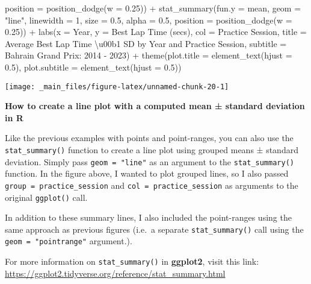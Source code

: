 \documentclass[
]{book}
\newenvironment{Shaded}{\begin{snugshade}}{\end{snugshade}}
\newcommand{\AttributeTok}[1]{\textcolor[rgb]{0.77,0.63,0.00}{#1}}
\newcommand{\DecValTok}[1]{\textcolor[rgb]{0.00,0.00,0.81}{#1}}
\newcommand{\FloatTok}[1]{\textcolor[rgb]{0.00,0.00,0.81}{#1}}
\newcommand{\FunctionTok}[1]{\textcolor[rgb]{0.00,0.00,0.00}{#1}}
\newcommand{\NormalTok}[1]{#1}
\newcommand{\SpecialCharTok}[1]{\textcolor[rgb]{0.00,0.00,0.00}{#1}}
\newcommand{\StringTok}[1]{\textcolor[rgb]{0.31,0.60,0.02}{#1}}
\begin{document}
\begin{Shaded}
\begin{Highlighting}[]
               \AttributeTok{position =} \FunctionTok{position\_dodge}\NormalTok{(}\AttributeTok{w =} \FloatTok{0.25}\NormalTok{)) }\SpecialCharTok{+}
  \FunctionTok{stat\_summary}\NormalTok{(}\AttributeTok{fun.y =}\NormalTok{ mean,}
               \AttributeTok{geom =} \StringTok{"line"}\NormalTok{, }
               \AttributeTok{linewidth =} \DecValTok{1}\NormalTok{, }\AttributeTok{size =} \FloatTok{0.5}\NormalTok{, }\AttributeTok{alpha =} \FloatTok{0.5}\NormalTok{,}
               \AttributeTok{position =} \FunctionTok{position\_dodge}\NormalTok{(}\AttributeTok{w =} \FloatTok{0.25}\NormalTok{)) }\SpecialCharTok{+}
  \FunctionTok{labs}\NormalTok{(}\AttributeTok{x =} \StringTok{\textquotesingle{}Year\textquotesingle{}}\NormalTok{,}
       \AttributeTok{y =} \StringTok{\textquotesingle{}Best Lap Time (secs)\textquotesingle{}}\NormalTok{,}
       \AttributeTok{col =} \StringTok{\textquotesingle{}Practice Session\textquotesingle{}}\NormalTok{,}
       \AttributeTok{title =} \StringTok{\textquotesingle{}Average Best Lap Time \textbackslash{}u00b1 SD by Year and Practice Session\textquotesingle{}}\NormalTok{,}
       \AttributeTok{subtitle =} \StringTok{\textquotesingle{}Bahrain Grand Prix: 2014 {-} 2023\textquotesingle{}}\NormalTok{) }\SpecialCharTok{+}
  \FunctionTok{theme}\NormalTok{(}\AttributeTok{plot.title =} \FunctionTok{element\_text}\NormalTok{(}\AttributeTok{hjust =} \FloatTok{0.5}\NormalTok{),}
        \AttributeTok{plot.subtitle =} \FunctionTok{element\_text}\NormalTok{(}\AttributeTok{hjust =} \FloatTok{0.5}\NormalTok{))}
\end{Highlighting}
\end{Shaded}

\begin{center}\texttt{[image: \_main\_files/figure-latex/unnamed-chunk-20-1]} \end{center}

\begin{blackbox}

\begin{center}
\textbf{How to create a line plot with a computed mean ± standard deviation in R}

\end{center}

Like the previous examples with points and point-ranges, you can also use the \texttt{stat\_summary()} function to create a line plot using grouped means ± standard deviation. Simply pass \texttt{geom\ =\ "line"} as an argument to the \texttt{stat\_summary()} function. In the figure above, I wanted to plot grouped lines, so I also passed \texttt{group\ =\ practice\_session} and \texttt{col\ =\ practice\_session} as arguments to the original \texttt{ggplot()} call.

In addition to these summary lines, I also included the point-ranges using the same approach as previous figures (i.e.~a separate \texttt{stat\_summary()} call using the \texttt{geom\ =\ "pointrange"} argument.).

For more information on \texttt{stat\_summary()} in \textbf{ggplot2}, visit this link: \url{https://ggplot2.tidyverse.org/reference/stat_summary.html}

\end{blackbox}
\end{document}
